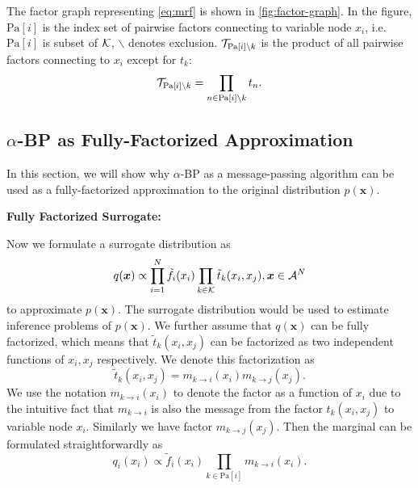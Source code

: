\documentclass{article}
\begin{document}
The factor graph representing \autoref{eq:mrf} is shown in \autoref{fig:factor-graph}. In the figure, $\text{Pa}[i]$ is the index set of pairwise factors connecting to variable node $x_i$, i.e. $\text{Pa}[i]$ is subset of $\mathcal{K}$, $\backslash$ denotes exclusion. $\mathcal{T}_{\text{Pa}[i]\backslash k}$ is the product of all pairwise factors connecting to $x_i$ except for $t_k$:
\begin{equation}
  \mathcal{T}_{\text{Pa}[i]\backslash k} = \prod_{n \in \text{Pa}[i]\backslash k}t_n.
\end{equation}




\subsection{$\alpha$-BP as Fully-Factorized Approximation}
In this section, we will show why $\alpha$-BP as a message-passing algorithm can be used as a fully-factorized approximation to the original distribution $p(\bm{x})$. 





\textbf{Fully Factorized Surrogate:}

Now we formulate a surrogate distribution as
\begin{equation}
  q(\bm{x}) \propto \prod_{{i=1}}^{N} \tilde{f}_i(x_i) \prod_{k\in \mathcal{K}} \tilde{t}_k(x_i, x_j), \bm{x} \in \mathcal{A}^N
\end{equation}
to approximate $p(\bm{x})$. The surrogate distribution would be used to estimate inference problems of $p(\bm{x})$. We further assume that $q(\bm{x})$ can be fully factorized, which means that $\tilde{t}_k(x_i, x_j)$ can be factorized as two independent functions of $x_i, x_j$ respectively. We denote this factorization as
\begin{equation}
  \tilde{t}_k(x_i, x_j) = m_{k\rightarrow i}(x_i) m_{k\rightarrow j}(x_j).
\end{equation}
We use the notation $m_{k\rightarrow i}(x_i)$ to denote the factor as a function of $x_i$ due to the intuitive fact that $m_{k\rightarrow i}$ is also the message from the factor $t_k(x_i, x_j)$ to variable node $x_i$. Similarly we have factor $m_{k\rightarrow j}(x_j)$. Then the marginal can be formulated straightforwardly as
\begin{equation}
  q_i(x_i) \propto \tilde{f}_i(x_i) \prod_{k\in \text{Pa}[i]} m_{k\rightarrow i}(x_i).
\end{equation}
\end{document}
